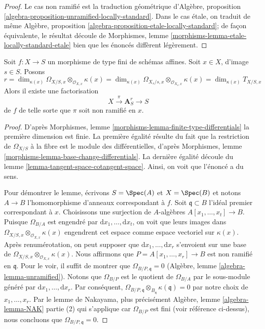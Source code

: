 \begin{proof}
Le cas non ramifié est la traduction géométrique d'Algèbre,
proposition
\ref{algebra-proposition-unramified-locally-standard}. Dans le cas
étale, on traduit de même Algèbre, proposition
\ref{algebra-proposition-etale-locally-standard}; de façon
équivalente, le résultat découle de Morphismes, lemme
\ref{morphisms-lemma-etale-locally-standard-etale} bien que les énoncés diffèrent légèrement.
\end{proof}

\begin{lemma}
\label{lemma-unramfied-over-affine}
Soit $f : X \to S$ un morphisme de type fini
de schémas affines. Soit $x \in X$, d'image $s \in S$. Posons
$$
r =
\dim_{\kappa(x)} \Omega_{X/S, x} \otimes_{\mathcal{O}_{X, x}} \kappa(x) =
\dim_{\kappa(x)} \Omega_{X_s/s, x} \otimes_{\mathcal{O}_{X_s, x}} \kappa(x) =
\dim_{\kappa(x)} T_{X/S, x}
$$
Alors il existe une factorisation
$$
X \xrightarrow{\pi} \mathbf{A}^r_S \to S
$$
de $f$ de telle sorte que $\pi$ soit non ramifié en $x$.
\end{lemma}

\begin{proof}
D'après Morphismes, lemme
\ref{morphisms-lemma-finite-type-differentials} la
première dimension est finie. La première égalité résulte
du fait que la restriction de $\Omega_{X/S}$ à la fibre
est le module des différentielles, d'après Morphismes, lemme
\ref{morphisms-lemma-base-change-differentials}. La
dernière égalité découle du lemme
\ref{lemma-tangent-space-cotangent-space}. Ainsi, on voit que l'énoncé a du sens.

\medskip\noindent
Pour démontrer le lemme, écrivons $S = \Spec(A)$ et $X = \Spec(B)$ et
notons $A \to B$ l'homomorphisme d'anneaux correspondant à $f$.
Soit $\mathfrak q \subset B$ l'idéal premier
correspondant à $x$. Choisissons une surjection de $A$-algèbres
$A[x_1, \ldots, x_t] \to B$. Puisque $\Omega_{B/A}$ est engendré
par $\text{d}x_1, \ldots, \text{d}x_t$, on voit que leurs images
dans $\Omega_{X/S, x} \otimes_{\mathcal{O}_{X, x}} \kappa(x)$
engendrent cet espace comme espace vectoriel sur $\kappa(x)$. Après
renumérotation, on peut supposer que $\text{d}x_1, \ldots,
\text{d}x_r$ s'envoient sur une base de $\Omega_{X/S, x}
\otimes_{\mathcal{O}_{X, x}} \kappa(x)$. Nous affirmons que $P = A[x_1,
\ldots, x_r] \to B$ est non ramifié en $\mathfrak q$. Pour le voir, il
suffit de montrer que $\Omega_{B/P, \mathfrak q} = 0$ (Algèbre, lemme
\ref{algebra-lemma-unramified}). Notons que $\Omega_{B/P}$ est le
quotient de $\Omega_{B/A}$ par le sous-module généré par $\text{d}x_1,
\ldots, \text{d}x_r$. Par conséquent, $\Omega_{B/P, \mathfrak q}
\otimes_{B_\mathfrak q} \kappa(\mathfrak q) = 0$ par notre choix de $x_1,
\ldots, x_r$. Par le lemme de Nakayama, plus précisément Algèbre, lemme
\ref{algebra-lemma-NAK} partie (2) qui s'applique car $\Omega_{B/P}$ est fini
(voir référence ci-dessus), nous concluons que $\Omega_{B/P, \mathfrak q} = 0$.
\end{proof}

